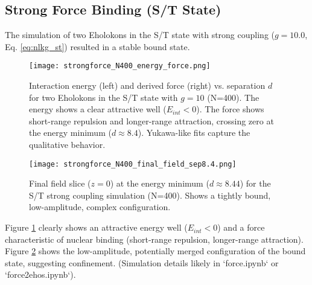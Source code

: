 \documentclass[11pt]{article}
\begin{document}
\subsection{Strong Force Binding (S/T State)}
The simulation of two Eholokons in the S/T state with strong coupling (\(g=10.0\), Eq. \ref{eq:nlkg_st}) resulted in a stable bound state.
\begin{figure}[htbp]
    \centering
    \texttt{[image: strongforce\_N400\_energy\_force.png]}
    \caption{Interaction energy (left) and derived force (right) vs. separation \(d\) for two Eholokons in the S/T state with \(g=10\) (N=400). The energy shows a clear attractive well (\(E_{int} < 0\)). The force shows short-range repulsion and longer-range attraction, crossing zero at the energy minimum (\(d \approx 8.4\)). Yukawa-like fits capture the qualitative behavior.}
    \label{fig:strong_force_energy_force}
\end{figure}
\begin{figure}[htbp]
    \centering
    \texttt{[image: strongforce\_N400\_final\_field\_sep8.4.png]}
    \caption{Final field slice (\(z=0\)) at the energy minimum (\(d \approx 8.44\)) for the S/T strong coupling simulation (N=400). Shows a tightly bound, low-amplitude, complex configuration.}
    \label{fig:strong_force_final_field}
\end{figure}
Figure \ref{fig:strong_force_energy_force} clearly shows an attractive energy well (\(E_{int} < 0\)) and a force characteristic of nuclear binding (short-range repulsion, longer-range attraction). Figure \ref{fig:strong_force_final_field} shows the low-amplitude, potentially merged configuration of the bound state, suggesting confinement. (Simulation details likely in `force.ipynb` or `force2ehos.ipynb`).
\end{document}
